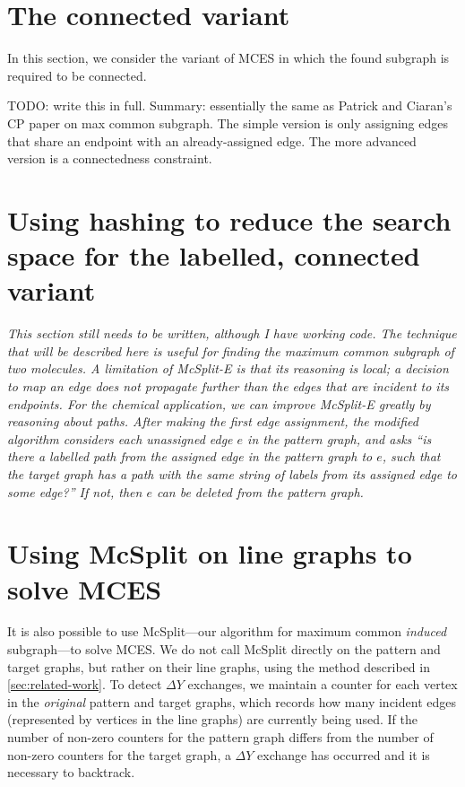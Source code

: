 \section{The connected variant}\label{sec:connected}

In this section, we consider the variant of MCES in which the found subgraph is required to be connected.

TODO: write this in full.  Summary: essentially the same as Patrick and Ciaran's CP paper on max
common subgraph.  The simple version is only assigning edges that share an endpoint with an
already-assigned edge.  The more advanced version is a connectedness constraint.

\section{Using hashing to reduce the search space for the labelled, connected variant}
\label{sec:hashing}

\emph{This section still needs to be written, although I have working code.
The technique that will be described here is useful for finding the maximum common subgraph of two
molecules.  A limitation of McSplit-E
is that its reasoning is local; a decision to map an edge does not propagate further than
the edges that are incident to its endpoints.  
For the chemical application, we can improve McSplit-E greatly by reasoning
about paths.  After making the first edge assignment, the modified algorithm considers each
unassigned edge $e$ in the pattern graph, and asks ``is there a labelled path from the assigned
edge in the pattern graph to $e$, such that the target graph has a path with the same string of labels from
its assigned edge to some edge?'' If not, then $e$ can be deleted from the pattern graph.}

\section{Using McSplit on line graphs to solve MCES}

It is also possible to use McSplit---our algorithm for maximum common \emph{induced} subgraph---to
solve MCES.
We do not call McSplit directly on the pattern and target graphs, but rather on their line graphs,
using the method described in \cref{sec:related-work}.  To detect $\Delta Y$ exchanges, we maintain
a counter for each vertex in the \textit{original} pattern and target graphs, which records how
many incident edges (represented by vertices in the line graphs) are currently being used.  If the
number of non-zero counters for the pattern graph differs from the number of non-zero counters
for the target graph, a $\Delta Y$ exchange has occurred and it is necessary to backtrack.
